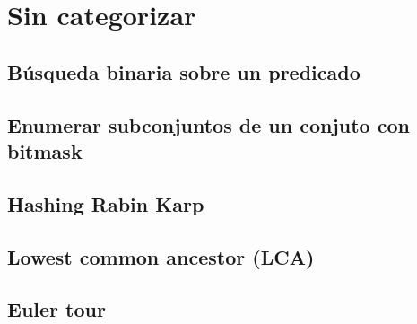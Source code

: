 \section{Sin categorizar}
    \subsection{Búsqueda binaria sobre un predicado}
    

    \subsection{Enumerar subconjuntos de un conjuto con bitmask}
    

    \subsection{Hashing Rabin Karp}
    

    \subsection{Lowest common ancestor (LCA)}
    

    \subsection{Euler tour}
    